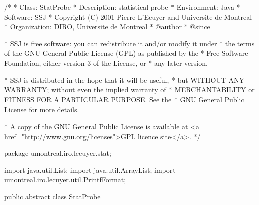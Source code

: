 \begin{code}
\begin{hide}
/*
 * Class:        StatProbe
 * Description:  statistical probe
 * Environment:  Java
 * Software:     SSJ
 * Copyright (C) 2001  Pierre L'Ecuyer and Universite de Montreal
 * Organization: DIRO, Universite de Montreal
 * @author
 * @since

 * SSJ is free software: you can redistribute it and/or modify it under
 * the terms of the GNU General Public License (GPL) as published by the
 * Free Software Foundation, either version 3 of the License, or
 * any later version.

 * SSJ is distributed in the hope that it will be useful,
 * but WITHOUT ANY WARRANTY; without even the implied warranty of
 * MERCHANTABILITY or FITNESS FOR A PARTICULAR PURPOSE.  See the
 * GNU General Public License for more details.

 * A copy of the GNU General Public License is available at
   <a href="http://www.gnu.org/licenses">GPL licence site</a>.
 */
\end{hide}
package umontreal.iro.lecuyer.stat;\begin{hide}
import java.util.List;
import java.util.ArrayList;
import umontreal.iro.lecuyer.util.PrintfFormat;
\end{hide}

public abstract class StatProbe\begin{hide} {

   private List<ObservationListener> listeners = new ArrayList<ObservationListener>();
   protected String name;
   protected double maxValue;
   protected double minValue;
   protected double sumValue;
   protected boolean collect = true;
   protected boolean broadcast = false;
   protected boolean showNobs = true;

\end{hide}
\end{code}

